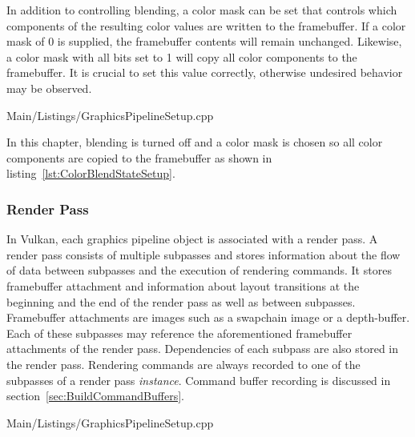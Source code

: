         In addition to controlling blending, a color mask can be set that controls which components of the resulting color values are written to the framebuffer.
        If a color mask of 0 is supplied, the framebuffer contents will remain unchanged.
        Likewise, a color mask with all bits set to 1 will copy all color components to the framebuffer.
        It is crucial to set this value correctly, otherwise undesired behavior may be observed.

        
        {Main/Listings/GraphicsPipelineSetup.cpp}

        In this chapter, blending is turned off and a color mask is chosen so all color components are copied to the framebuffer as shown in listing~\ref{lst:ColorBlendStateSetup}.


      \subsubsection{Render Pass}
      \label{sss:RenderPassSetup}
        In Vulkan, each graphics pipeline object is associated with a render pass.
        A render pass consists of multiple subpasses and stores information about the flow of data between subpasses and the execution of rendering commands.
        It stores framebuffer attachment and information about layout transitions at the beginning and the end of the render pass as well as between subpasses.
        Framebuffer attachments are images such as a swapchain image or a depth-buffer.
        Each of these subpasses may reference the aforementioned framebuffer attachments of the render pass.
        Dependencies of each subpass are also stored in the render pass.
        Rendering commands are always recorded to one of the subpasses of a render pass \textit{instance}.
        Command buffer recording is discussed in section~\ref{sec:BuildCommandBuffers}.


        
        {Main/Listings/GraphicsPipelineSetup.cpp}

